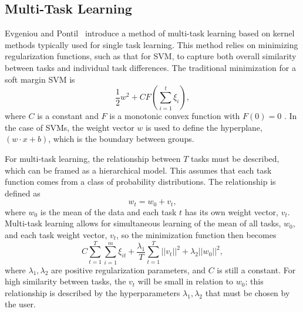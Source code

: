 \documentclass{llncs}
\begin{document}

\subsection{Multi-Task Learning}
\label{subsec:MTL}
Evgeniou and Pontil~\cite{regMTL} introduce a method of multi-task learning based on kernel methods typically used for single task learning.  This method relies on minimizing regularization functions, such as that for SVM, to capture both overall similarity between tasks and individual task differences.  The traditional minimization for a soft margin SVM is
\begin{equation}
\label{eq:svm}
\frac{1}{2}w^2 + C F\left(\sum_{i=1}^t \xi_i\right),
\end{equation}
where $C$ is a constant and $F$ is a monotonic convex function with $F(0)=0$ \cite{svm}. In the case of SVMs, the weight vector $w$ is used to define the hyperplane, $(w \cdot x +b)$,  which is the boundary between groups.

For multi-task learning, the relationship between $T$ tasks must be described, which can be framed as a hierarchical model. This assumes that each task function comes from a class of probability distributions.  The relationship is defined as\\
\begin{equation}
\label{eq:sim}
 w_t = w_0 + v_t ,
\end{equation}
where $w_0$ is the mean of the data and each task $t$ has its own weight vector, $v_t$. Multi-task learning allows for simultaneous learning of the mean of all tasks, $w_0$, and each task weight vector, $v_t$, so the minimization function then becomes\\
\begin{equation}
\label{eq:mtlsvm}
 C \sum_{t=1}^T \sum_{i=1}^m \xi_{it} + \frac{\lambda_1}{T} \sum_{t=1}^T ||v_t||^2 + \lambda_2||w_0||^2 ,
\end{equation}
where $\lambda_1, \lambda_2$ are positive regularization parameters, and $C$ is still a constant. For high similarity between tasks, the $v_t$ will be small in relation to $w_0$; this relationship is described by the hyperparameters $\lambda_1, \lambda_2$ that must be chosen by the user.
\end{document}
